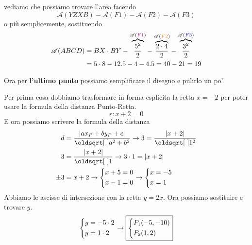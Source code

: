 vediamo che possiamo trovare l'area facendo
\begin{equation*}
  \mathscr{A}(YZXB) - \mathscr{A}(F1) - \mathscr{A}(F2) - \mathscr{A}(F3)
\end{equation*}
o più semplicemente, sostituendo
\begin{align*}
  \mathscr{A}(ABCD) &= BX\cdot BY - \overbrace{\frac{5^2}{2}}^{\mathscr{A}(\mathcolor{magenta}{F1})} - 
  \overbrace{\frac{2\cdot4}{2}}^{\mathscr{A}(\mathcolor{orange}{F2})} -
  \overbrace{\frac{3^2}{2}}^{\mathscr{A}(\mathcolor{blue}{F3})} \\
  &= 5\cdot8 - 12.5 - 4 -4.5 = 40 - 21 = 19
\end{align*}

Ora per \textbf{l'ultimo punto} possiamo semplificare il disegno e pulirlo un po'.
\begin{center}
\end{center}

Per prima cosa dobbiamo trasformare in forma esplicita la retta $x = -2$ per poter usare la formula
della distanza Punto-Retta.
\begin{equation*}
  r: x + 2 = 0
\end{equation*}
E ora possiamo scrivere la formula della distanza
\begin{align*}
  d &= \frac{\left\lvert ax_P + by_P+c\right\rvert}{\sqrt{a^2+b^2}} \rightarrow
  3 = \frac{\left\lvert x + 2\right\rvert}{\sqrt{1^2}} \\
  3 &= \frac{\left\lvert x + 2\right\rvert}{\sqrt{1}} \rightarrow
  3\cdot1 = \left\lvert x + 2\right\rvert\\
  \pm3 &= x + 2 \rightarrow \begin{dcases}
    x + 5 = 0\\
    x - 1 = 0
  \end{dcases} \rightarrow
  \begin{dcases}
    x = -5\\
    x = 1
  \end{dcases}
\end{align*}
Abbiamo le ascisse di intersezione con la retta $y = 2x$. Ora possiamo sostituire e trovare $y$.
\begin{equation*}
  \begin{dcases}
    y = -5\cdot2\\
    y = 1\cdot2
  \end{dcases} \rightarrow
  \boxed{\begin{dcases}
      P_1(-5,-10)\\
      P_2(1,2)
  \end{dcases}}
\end{equation*}

